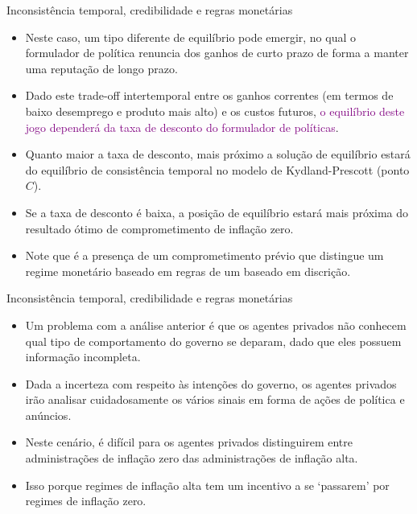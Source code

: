 \documentclass[10pt]{beamer}
\begin{document}
\begin{frame}{Inconsistência temporal, credibilidade e regras monetárias}
    \begin{itemize}
        \item Neste caso, um tipo diferente de equilíbrio pode emergir, no qual o formulador de política renuncia dos ganhos de curto prazo de forma a manter uma reputação de longo prazo.
        \bigskip
        \item Dado este trade-off intertemporal entre os ganhos correntes (em termos de baixo desemprego e produto mais alto) e os custos futuros, \textcolor{purple}{o equilíbrio deste jogo dependerá da taxa de desconto do formulador de políticas}.
        \bigskip
        \item Quanto maior a taxa de desconto, mais próximo a solução de equilíbrio estará do equilíbrio de consistência temporal no modelo de Kydland-Prescott (ponto $C$).
        \bigskip
        \item Se a taxa de desconto é baixa, a posição de equilíbrio estará mais próxima do resultado ótimo de comprometimento de inflação zero.
        \bigskip
        \item Note que é a presença de um comprometimento prévio que distingue um regime monetário baseado em regras de um baseado em discrição.
    \end{itemize}
\end{frame}

\begin{frame}{Inconsistência temporal, credibilidade e regras monetárias}
    \begin{itemize}
        \item Um problema com a análise anterior é que os agentes privados não conhecem qual tipo de comportamento do governo se deparam, dado que eles possuem informação incompleta.
        \bigskip
        \item Dada a incerteza com respeito às intenções do governo, os agentes privados irão analisar cuidadosamente os vários sinais em forma de ações de política e anúncios.
        \bigskip
        \item Neste cenário, é difícil para os agentes privados distinguirem entre administrações de inflação zero das administrações de inflação alta.
        \bigskip
        \item Isso porque regimes de inflação alta tem um incentivo a se `passarem' por regimes de inflação zero.
    \end{itemize}
\end{frame}
\end{document}
